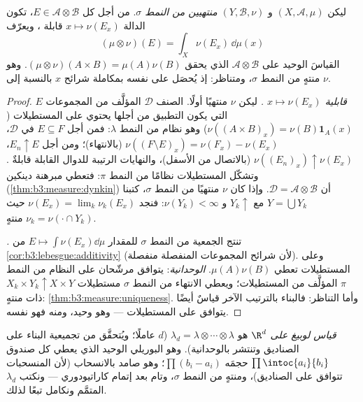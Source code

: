 \begin{theorem}\label{thm:b3:product:existence}
ليكن $(X, \mathcal A, \mu)$ و $(Y, \mathcal B, \nu)$ \emph{منتهيين من النمط $\sigma$}. من أجل
كل $E \in \mathcal
A\otimes\mathcal B$، تكون الدالة $x \mapsto \nu(E_x)$ قابلة ، ويعرّف
\[
(\mu\otimes\nu)(E) = \int_X \nu(E_x)\,\dd\mu(x)
\]
القياسَ الوحيد على $\mathcal A\otimes\mathcal B$ الذي يحقق $(\mu\otimes\nu)(A\times B) = \mu(A)\nu(B)$. وهو منتهٍ من النمط
$\sigma$، ومتناظر: إذ يُحصَل على  نفسه بمكاملة شرائح $x$
بالنسبة إلى $\nu$.
\end{theorem}

\begin{proof}
\emph{قابلية $x \mapsto \nu(E_x)$ .} ليكن $\nu$ منتهيًا أولًا. الصنف
$\mathcal D$ المؤلَّف من المجموعات $E$ التي يكون التطبيق من أجلها
 يحتوي على المستطيلات ($\nu((A\times B)_x) =
\nu(B)\mathbf 1_A(x)$) وهو نظام من النمط
$\lambda$: فمن أجل $E
\subseteq F$ في $\mathcal D$، $\nu((F\setminus E)_x) =
\nu(F_x) - \nu(E_x)$ (بالانتهاء)؛
ومن أجل $E_n \uparrow E$، $\nu((E_n)_x) \uparrow \nu(E_x)$ (بالاتصال من الأسفل)، والنهايات
الرتيبة للدوال القابلة  قابلةٌ . وتشكّل المستطيلات
نظامًا من النمط $\pi$: فتعطي مبرهنة دينكين (\cref{thm:b3:measure:dynkin}) أن
$\mathcal D = \mathcal
A\otimes\mathcal B$. وإذا كان $\nu$ منتهيًا من النمط $\sigma$، كتبنا $Y =
\bigcup Y_k$
مع $Y_k \uparrow$ و $\nu(Y_k) < \infty$: فنجد $\nu(E_x) =
\lim_k\nu_k(E_x)$ حيث $\nu_k = \nu(\cdot\cap Y_k)$ منتهٍ.

\emph{.} تنتج الجمعية من النمط $\sigma$ للمقدار $E \mapsto
\int\nu(E_x)\dd\mu$ من
\cref{cor:b3:lebesgue:additivity} (لأن شرائح المجموعات المنفصلة منفصلة). وعلى
المستطيلات تعطي $\mu(A)\nu(B)$. \emph{الوحدانية}: يتوافق مرشّحان
على النظام من النمط $\pi$ المؤلَّف من المستطيلات؛ ويعطي الانتهاء
من النمط $\sigma$ مستطيلات $X_k\times
Y_k \uparrow X\times Y$ ذات  منتهٍ: \cref{thm:b3:measure:uniqueness}.
وأما التناظر: فالبناء بالترتيب الآخر قياسٌ أيضًا يتوافق على
المستطيلات --- وهو وحيد، ومنه فهو  نفسه.
\end{proof}

\begin{definition}\label{def:b3:product:lebesgue}
\emph{قياس لوبيغ على $\R^d$} هو
$\lambda_d = \lambda\otimes\cdots\otimes\lambda$ ($d$ عاملًا؛ ويُتحقَّق من تجميعية البناء على الصناديق
وتنتشر بالوحدانية). وهو  البوريلي الوحيد الذي يعطي كل
صندوق $\prod\intoc{a_i}{b_i}$ حجمَه $\prod(b_i - a_i)$؛ وهو صامد بالانسحاب (لأن المنسحبات
تتوافق على الصناديق)، ومنتهٍ من النمط $\sigma$، وتام بعد إتمام
كاراتيودوري --- ونكتب $\lambda_d$  المتمَّم ونكامل تبعًا
لذلك.
\end{definition}

